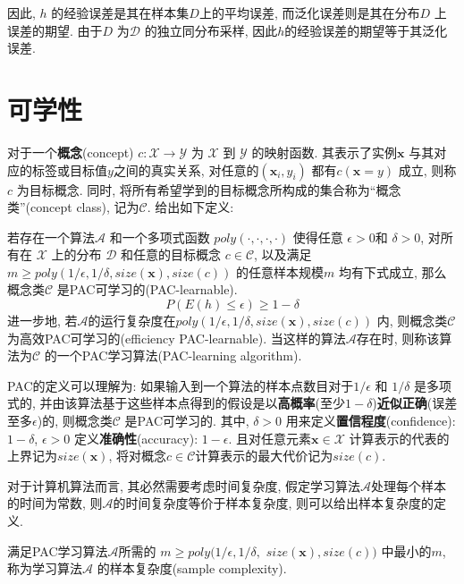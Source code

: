 因此, $h$ 的经验误差是其在样本集$D$上的平均误差, 而泛化误差则是其在分布$D$ 上误差的期望. 由于$D$ 为$\mathcal{D}$ 的独立同分布采样, 因此$h$的经验误差的期望等于其泛化误差.
\section{可学性}
对于一个\textbf{概念}(concept) $ c:\mathcal{X}\rightarrow \mathcal{Y}$ 为 $\mathcal{X}$ 到 $\mathcal{Y}$  的映射函数. 其表示了实例$\mathbf{x}$ 与其对应的标签或目标值$y$之间的真实关系, 对任意的$(\mathbf{x}_i,y_i)$ 都有$c(\mathbf{x}=y)$ 成立, 则称$c$ 为目标概念.  同时, 将所有希望学到的目标概念所构成的集合称为“概念类”(concept class), 记为$\mathcal{C}$. 给出如下定义: 

\begin{definition}[PAC学习]
若存在一个算法$\mathcal{A}$ 和一个多项式函数 $poly\left( \cdot ,\cdot ,\cdot ,\cdot \right)$ 使得任意 $\epsilon >0$和 $\delta >0$, 对所有在 $\mathcal{X}$ 上的分布 $\mathcal{D} $ 和任意的目标概念 $c\in\mathcal{C}$, 以及满足$m\ge poly\left( {1}/{\epsilon},{1}/{\delta},size(\mathbf{x}),size\left( c \right) \right) $ 的任意样本规模$m$ 均有下式成立, 那么概念类$\mathcal{C}$ 是PAC可学习的(PAC-learnable).
\begin{equation}
P\left( E\left( h \right) \le \epsilon \right) \ge 1-\delta
\end{equation}
进一步地, 若$\mathcal{A}$的运行复杂度在$poly\left( {1}/{\epsilon},{1}/{\delta},size(\mathbf{x}),size\left( c \right) \right) $ 内, 则概念类$\mathcal{C}$ 为高效PAC可学习的(efficiency PAC-learnable). 当这样的算法$\mathcal{A}$存在时, 则称该算法为$\mathcal{C}$ 的一个PAC学习算法(PAC-learning algorithm).
\end{definition}


PAC的定义可以理解为: 如果输入到一个算法的样本点数目对于${1}/{\epsilon}$ 和 ${1}/{\delta} $ 是多项式的, 并由该算法基于这些样本点得到的假设是以\textbf{高概率}(至少$1-\delta$)\textbf{近似正确}(误差至多$\epsilon$)的, 则概念类$\mathcal{C}$ 是PAC可学习的. 其中, $\delta>0$ 用来定义\textbf{置信程度}(confidence): $1-\delta$, $\epsilon >0$ 定义\textbf{准确性}(accuracy): $1-\epsilon$. 且对任意元素$\mathbf{x} \in \mathcal{X}$ 计算表示的代表的上界记为$size(\mathbf{x})$, 将对概念$c \in \mathcal{C}$计算表示的最大代价记为$size(c)$.

对于计算机算法而言, 其必然需要考虑时间复杂度,  假定学习算法$\mathcal{A}$处理每个样本的时间为常数, 则$\mathcal{A}$的时间复杂度等价于样本复杂度, 则可以给出样本复杂度的定义.  

\begin{definition}[样本复杂度]
满足PAC学习算法$\mathcal{A}$所需的 $m \ge poly ( {1}/{\epsilon},{1}/{\delta}, $
 $size(\mathbf{x}),size(c)) $ 中最小的$m$, 称为学习算法$\mathcal{A}$ 的样本复杂度(sample complexity).
\end{definition}

